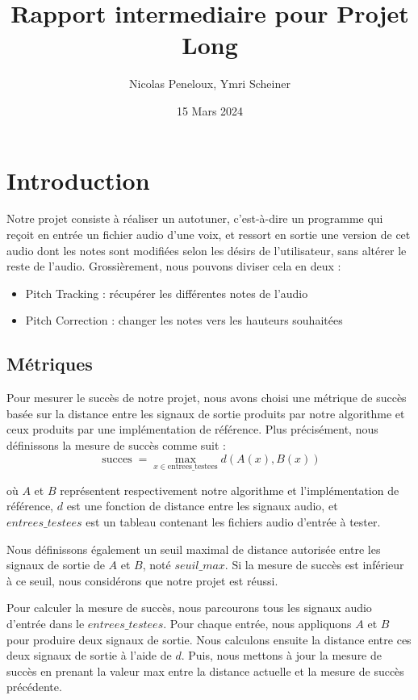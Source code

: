 \documentclass{article}
\title{Rapport intermediaire pour Projet Long}
\author{Nicolas Peneloux, Ymri Scheiner}
\date{15 Mars 2024}
\begin{document}
\maketitle

\section{Introduction}

Notre projet consiste à réaliser un autotuner, c'est-à-dire un programme qui reçoit en entrée un fichier audio d'une voix, et ressort en sortie une version de cet audio dont les notes sont modifiées selon les désirs de l'utilisateur, sans altérer le reste de l'audio. Grossièrement, nous pouvons diviser cela en deux :
\begin{itemize}
  \item Pitch Tracking : récupérer les différentes notes de l'audio
  \item Pitch Correction : changer les notes vers les hauteurs souhaitées
\end{itemize}
\par 

\subsection*{Métriques}
Pour mesurer le succès de notre projet, nous avons choisi une métrique de succès basée sur la distance entre les signaux de sortie produits par notre algorithme et ceux produits par une 
implémentation de référence. Plus précisément, nous définissons la mesure de succès comme suit :
\begin{equation}
    \operatorname{succes} = \max_{x \in \mathrm{entrees\_testees}} d(A(x), B(x))
\end{equation}
\par

où \( \mathit{A} \) et \( \mathit{B} \) représentent respectivement notre algorithme et l'implémentation de référence, \(\textit{d}\) est une fonction de distance entre les signaux audio, et \(\mathit{entrees\_testees}\) est un tableau contenant les fichiers audio d'entrée à tester.
\par
Nous définissons également un seuil maximal de distance autorisée entre les signaux de sortie de \(\textit{A}\) et \(\textit{B}\), noté \(\textit{seuil\_max}\). Si la mesure de succès est inférieur
à ce seuil, nous considérons que notre projet est réussi.

Pour calculer la mesure de succès, nous parcourons tous les signaux audio d'entrée dans le \( \textit{entrees\_testees} \). Pour chaque entrée, nous appliquons \( \textit{A} \) et \( \textit{B} \) pour produire deux signaux de sortie. Nous calculons ensuite la distance entre ces deux signaux de sortie à l'aide de \( \textit{d} \). Puis, nous mettons à jour la mesure de succès en prenant la valeur max entre la distance actuelle et la mesure de succès précédente.
\end{document}
